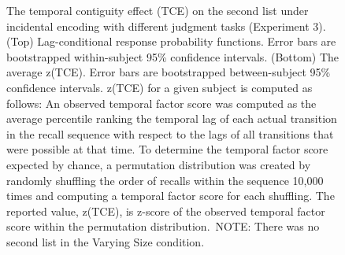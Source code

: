 \documentclass[man,natbib,floatsintext]{apa6} %
\begin{document}
\begin{figure}%
\caption{The temporal contiguity effect (TCE) on the second list under incidental encoding with different judgment tasks (Experiment 3). (Top) Lag-conditional response probability functions. Error bars are bootstrapped within-subject 95\% confidence intervals. (Bottom) The average z(TCE).  Error bars are bootstrapped between-subject 95\% confidence intervals. z(TCE) for a given subject is computed as follows: An observed temporal factor score was computed as the average percentile ranking the temporal lag of each actual transition in the recall sequence with respect to the lags of all transitions that were possible at that time. To determine the temporal factor score expected by chance, a permutation distribution was created by randomly shuffling the order of recalls within the sequence 10,000 times and computing a temporal factor score for each shuffling. The reported value, z(TCE), is z-score of the observed temporal factor score within the permutation distribution.~NOTE: There was no second list in the Varying Size condition.}
\label{e3_l2_crp}
\end{figure}


\end{document}
